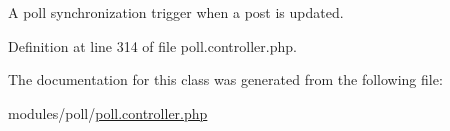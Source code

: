 A poll synchronization trigger when a post is updated. 



Definition at line 314 of file poll.\+controller.\+php.



The documentation for this class was generated from the following file\+:\begin{DoxyCompactItemize}
\item 
modules/poll/\hyperlink{poll_8controller_8php}{poll.\+controller.\+php}\end{DoxyCompactItemize}
